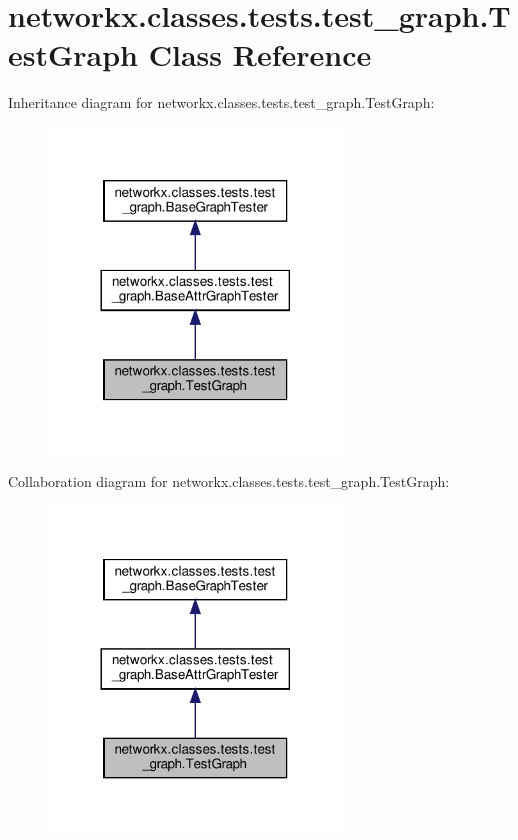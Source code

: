 \hypertarget{classnetworkx_1_1classes_1_1tests_1_1test__graph_1_1TestGraph}{}\section{networkx.\+classes.\+tests.\+test\+\_\+graph.\+Test\+Graph Class Reference}
\label{classnetworkx_1_1classes_1_1tests_1_1test__graph_1_1TestGraph}


Inheritance diagram for networkx.\+classes.\+tests.\+test\+\_\+graph.\+Test\+Graph\+:
\nopagebreak
\begin{figure}[H]
\begin{center}
\leavevmode
\includegraphics[width=221pt]{classnetworkx_1_1classes_1_1tests_1_1test__graph_1_1TestGraph__inherit__graph}
\end{center}
\end{figure}


Collaboration diagram for networkx.\+classes.\+tests.\+test\+\_\+graph.\+Test\+Graph\+:
\nopagebreak
\begin{figure}[H]
\begin{center}
\leavevmode
\includegraphics[width=221pt]{classnetworkx_1_1classes_1_1tests_1_1test__graph_1_1TestGraph__coll__graph}
\end{center}
\end{figure}
